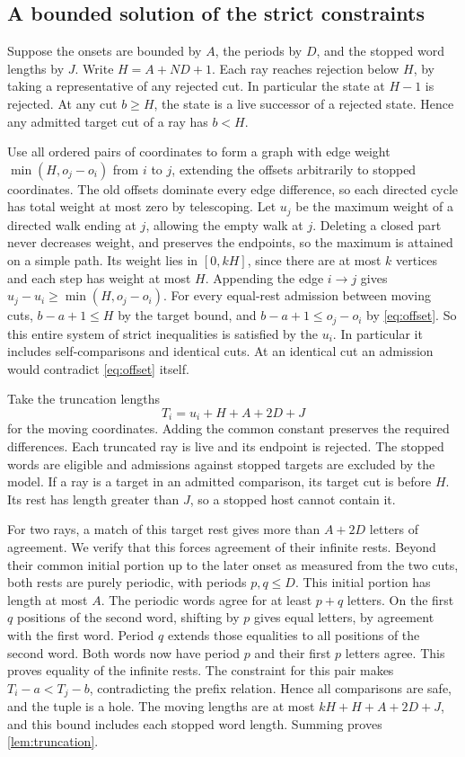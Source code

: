 \subsection{A bounded solution of the strict constraints}

Suppose the onsets are bounded by $A$, the periods by $D$, and
the stopped word lengths by $J$. Write $H=A+ND+1$.
Each ray reaches rejection below $H$, by taking a representative
of any rejected cut. In particular the state at $H-1$ is
rejected. At any cut $b\ge H$, the state is a live successor
of a rejected state. Hence any admitted target cut of a ray
has $b<H$.

Use all ordered pairs of coordinates to form a graph with edge
weight $\min(H,o_j-o_i)$ from $i$ to $j$, extending the offsets
arbitrarily to stopped coordinates. The old offsets dominate
every edge difference, so each directed cycle has total weight
at most zero by telescoping. Let $u_j$ be the maximum weight of
a directed walk ending at $j$, allowing the empty walk at $j$.
Deleting a closed part never decreases weight, and preserves the
endpoints, so the maximum is attained on a simple path. Its
weight lies in $[0,kH]$, since there are at most $k$ vertices
and each step has weight at most $H$. Appending the edge $i\to j$
gives $u_j-u_i\ge\min(H,o_j-o_i)$. For every equal-rest
admission between moving cuts, $b-a+1\le H$ by the target bound,
and $b-a+1\le o_j-o_i$ by \eqref{eq:offset}. So this entire
system of strict inequalities is satisfied by the $u_i$.
In particular it includes self-comparisons and identical cuts.
At an identical cut an admission would contradict
\eqref{eq:offset} itself.

Take the truncation lengths
\[
                T_i=u_i+H+A+2D+J
\]
for the moving coordinates. Adding the common constant preserves
the required differences. Each truncated ray is live and its
endpoint is rejected. The stopped words are eligible and
admissions against stopped targets are excluded by the model.
If a ray is a target in an admitted comparison, its target cut
is before $H$. Its rest has length greater than $J$, so a
stopped host cannot contain it.

For two rays, a match of this target rest gives more than
$A+2D$ letters of agreement. We verify that this forces agreement
of their infinite rests. Beyond their common initial portion up
to the later onset as measured from the two cuts, both rests are
purely periodic, with periods $p,q\le D$. This initial portion
has length at most $A$. The periodic words agree for at least
$p+q$ letters. On the first $q$ positions of the second word,
shifting by $p$ gives equal letters, by agreement with the
first word. Period $q$ extends those equalities to all positions
of the second word. Both words now have period $p$ and their first
$p$ letters agree. This proves equality of the infinite rests.
The constraint for this pair makes $T_i-a<T_j-b$, contradicting
the prefix relation. Hence all comparisons are safe, and the
tuple is a hole. The moving lengths are at most $kH+H+A+2D+J$,
and this bound includes each stopped word length. Summing proves
\cref{lem:truncation}.
